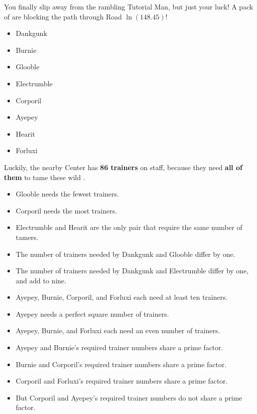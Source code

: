 

You finally slip away from the rambling Tutorial Man, but just your luck!
A pack of \mappMobimon{} are blocking the path
through Road \(\ln(148.45)\)!

\begin{multicols}{2}
\begin{itemize}
  \item {Dankgunk}
  \item {Burnie}
  \item {Glooble}
  \item {Electrumble}
  \item {Corporil}
  \item {Ayepey}
  \item {Hearit}
  \item {Forluxi}
\end{itemize}
\end{multicols}

Luckily, the nearby \mappMobimon{} Center has \textbf{86 trainers} on staff,
because they need \textbf{all of them} to tame these wild \mappMobimon{}.

\begin{multicols}{2}
\begin{itemize}
\item Glooble needs the fewest trainers.
\item Corporil needs the most trainers.
\item Electrumble and Hearit are the only pair that require
      the same number of tamers.
\item The number of trainers needed by Dankgunk and Glooble differ by one.
\item The number of trainers needed by Dankgunk and Electrumble differ by one,
      and add to nine.
\item Ayepey, Burnie, Corporil, and Forluxi each need at least ten
      trainers.
\item Ayepey needs a perfect square number of trainers.
\item Ayepey, Burnie, and Forluxi each need an even number of trainers.
\item Ayepey and Burnie's required trainer numbers share a prime factor.
\item Burnie and Corporil's required trainer numbers share a prime factor.
\item Corporil and Forluxi's required trainer numbers share a prime factor.
\item But Corporil and Ayepey's required trainer numbers do not
      share a prime factor.
\end{itemize}
\end{multicols}

